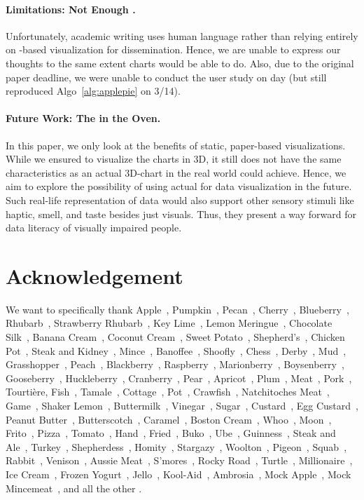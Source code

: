 \documentclass[11pt,letterpaper]{article}
\def\pie{}%
\newcommand{\pie}{{\fontspec{Symbola}\char"1F967}}
\begin{document}
\paragraph{Limitations: Not Enough \pie{}.}
Unfortunately, academic writing uses human language rather than relying entirely on \pie{}-based visualization for dissemination. Hence, we are unable to express our thoughts to the same extent \pie{}charts would be able to do. Also, due to the original paper deadline, we were unable to conduct the user study on \pie{} day (but still reproduced Algo~\ref{alg:applepie} on 3/14).

\paragraph{Future Work: The \pie{} in the Oven.}
In this paper, we only look at the benefits of static, paper-based \pie{} visualizations. While we ensured to visualize the \pie{}charts in 3D, it still does not have the same characteristics as an actual 3D-\pie{}chart in the real world could achieve. Hence, we aim to explore the possibility of using actual \pie{}\pie{} for data visualization in the future. Such real-life representation of data would also support other sensory stimuli like haptic, smell, and taste besides just visuals. Thus, they present a way forward for data literacy of visually impaired people.

\section{Acknowledgement}

We want to specifically thank 
Apple~\pie{}, Pumpkin~\pie{}, Pecan~\pie{}, Cherry~\pie{}, Blueberry~\pie{}, Rhubarb~\pie{}, Strawberry Rhubarb~\pie{}, Key Lime~\pie{}, Lemon Meringue~\pie{}, Chocolate Silk~\pie{}, Banana Cream~\pie{}, Coconut Cream~\pie{}, Sweet Potato~\pie{}, Shepherd's~\pie{}, Chicken Pot~\pie{}, Steak and Kidney~\pie{}, Mince~\pie{}, Banoffee~\pie{}, Shoofly~\pie{}, Chess~\pie{}, Derby~\pie{}, Mud~\pie{}, Grasshopper~\pie{}, Peach~\pie{}, Blackberry~\pie{}, Raspberry~\pie{}, Marionberry~\pie{}, Boysenberry~\pie{}, Gooseberry~\pie{}, Huckleberry~\pie{}, Cranberry~\pie{}, Pear~\pie{}, Apricot~\pie{}, Plum~\pie{}, Meat~\pie{}, Pork~\pie{}, Tourtière, Fish~\pie{}, Tamale~\pie{}, Cottage~\pie{}, Pot~\pie{}, Crawfish~\pie{}, Natchitoches Meat~\pie{}, Game~\pie{}, Shaker Lemon~\pie{}, Buttermilk~\pie{}, Vinegar~\pie{}, Sugar~\pie{}, Custard~\pie{}, Egg Custard~\pie{}, Peanut Butter~\pie{}, Butterscotch~\pie{}, Caramel~\pie{}, Boston Cream~\pie{}, Whoo\pie{}~\pie{}, Moon~\pie{}, Frito~\pie{}, Pizza~\pie{}, Tomato~\pie{}, Hand~\pie{}, Fried~\pie{}, Buko~\pie{}, Ube~\pie{}, Guinness~\pie{}, Steak and Ale~\pie{}, Turkey~\pie{}, Shepherdess~\pie{}, Homity~\pie{}, Stargazy~\pie{}, Woolton~\pie{}, Pigeon~\pie{}, Squab~\pie{}, Rabbit~\pie{}, Venison~\pie{}, Aussie Meat~\pie{}, S'mores~\pie{}, Rocky Road~\pie{}, Turtle~\pie{}, Millionaire~\pie{}, Ice Cream~\pie{}, Frozen Yogurt~\pie{}, Jello~\pie{}, Kool-Aid~\pie{}, Ambrosia~\pie{}, Mock Apple~\pie{}, Mock Mincemeat~\pie{}, and all the other \pie{}\pie{}.
\end{document}
